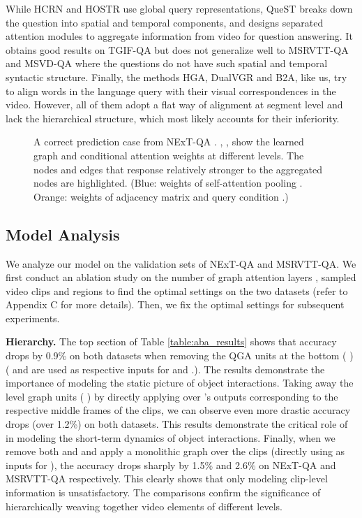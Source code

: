 \documentclass[letterpaper]{article} \usepackage{aaai21}  \usepackage{times}  \usepackage{helvet} \usepackage{courier}  \usepackage[hyphens]{url}  \usepackage{graphicx} \urlstyle{rm} \def\UrlFont{\rm}  \usepackage{natbib}  \usepackage{caption} \usepackage{color, colortbl}
\begin{document}
While HCRN and HOSTR use global query representations, QueST breaks down the question into spatial and temporal components, and designs separated attention modules to aggregate information from video for question answering. It obtains good results on TGIF-QA but does not generalize well to MSRVTT-QA and MSVD-QA where the questions do not have such spatial and temporal syntactic structure. Finally, the methods HGA, DualVGR and B2A, like us, try to align words in the language query with their visual correspondences in the video. However, all of them adopt a flat way of alignment at segment level and lack the hierarchical structure, which most likely accounts for their inferiority.

\begin{figure*}[t]
 \centering
 \caption{A correct prediction case from NExT-QA \cite{xiao2021next}. , ,  show the learned graph and conditional attention weights at different levels. The nodes and edges that response relatively stronger to the aggregated nodes are highlighted. (Blue: weights of self-attention pooling . Orange: weights of adjacency matrix  and query condition .)}
 \label{fig:qual_result}
\vspace{-.5em}
 \end{figure*}


\subsection{Model Analysis}
We analyze our model on the validation sets of NExT-QA and MSRVTT-QA. We first conduct an ablation study on the number of graph attention layers , sampled video clips  and regions  to find the optimal settings on the two datasets (refer to Appendix C for more details). Then, we fix the optimal settings for subsequent experiments. 



\textbf{Hierarchy.} The top section of Table \ref{table:aba_results} shows that accuracy drops by 0.9\% on both datasets when removing the QGA units at the bottom ( ) ( and  are used as respective inputs for  and .). The results demonstrate the importance of modeling the static picture of object interactions. Taking away the  level graph units ( ) by directly applying  over 's outputs corresponding to the respective middle frames of the clips, we can observe even more drastic accuracy drops (over 1.2\%) on both datasets. This results demonstrate the critical role of  in modeling the short-term dynamics of object interactions. Finally, when we remove both  and  and apply a monolithic graph over the clips (directly using  as inputs for ), the accuracy drops sharply by 1.5\% and 2.6\% on NExT-QA and MSRVTT-QA respectively. This clearly shows that only modeling clip-level information is unsatisfactory. The comparisons confirm the significance of hierarchically weaving together video elements of different levels.
\end{document}
